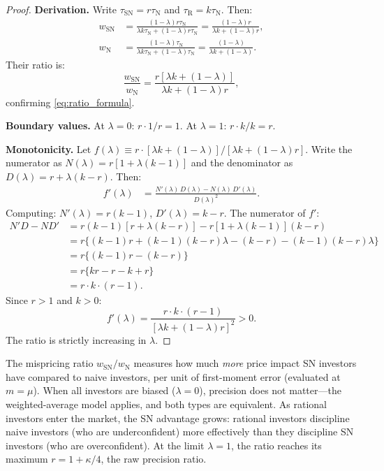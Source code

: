 \documentclass[12pt]{article}
\theoremstyle{plain}
\theoremstyle{definition}
\newcommand{\R}{\mathrm{R}}
\newcommand{\SN}{\mathrm{SN}}
\newcommand{\N}{\mathrm{N}}
\begin{document}
\begin{proof}
\textbf{Derivation.} Write $\tau_\SN = r\tau_\N$ and $\tau_\R = k\tau_\N$. Then:
\begin{align*}
w_\SN &= \frac{(1-\lambda)r\tau_\N}{\lambda k\tau_\N + (1-\lambda)r\tau_\N} = \frac{(1-\lambda)r}{\lambda k + (1-\lambda)r}, \\
w_\N &= \frac{(1-\lambda)\tau_\N}{\lambda k\tau_\N + (1-\lambda)\tau_\N} = \frac{(1-\lambda)}{\lambda k + (1-\lambda)}.
\end{align*}
Their ratio is:
\[
\frac{w_\SN}{w_\N} = \frac{r[\lambda k + (1-\lambda)]}{\lambda k + (1-\lambda)r},
\]
confirming \eqref{eq:ratio_formula}.

\textbf{Boundary values.} At $\lambda = 0$: $r \cdot 1/r = 1$. At $\lambda = 1$: $r \cdot k/k = r$.

\textbf{Monotonicity.} Let $f(\lambda) \equiv r \cdot [\lambda k + (1-\lambda)] / [\lambda k + (1-\lambda)r]$. Write the numerator as $N(\lambda) = r[1 + \lambda(k-1)]$ and the denominator as $D(\lambda) = r + \lambda(k - r)$. Then:
\begin{align*}
f'(\lambda) &= \frac{N'(\lambda)\,D(\lambda) - N(\lambda)\,D'(\lambda)}{D(\lambda)^2}.
\end{align*}
Computing: $N'(\lambda) = r(k-1)$, $D'(\lambda) = k - r$. The numerator of $f'$:
\begin{align*}
N'D - ND' &= r(k-1)[r + \lambda(k-r)] - r[1 + \lambda(k-1)](k-r) \\
&= r\bigl\{(k-1)r + (k-1)(k-r)\lambda - (k-r) - (k-1)(k-r)\lambda\bigr\} \\
&= r\bigl\{(k-1)r - (k-r)\bigr\} \\
&= r\bigl\{kr - r - k + r\bigr\} \\
&= r \cdot k \cdot (r - 1).
\end{align*}
Since $r > 1$ and $k > 0$:
\begin{equation}
\boxed{f'(\lambda) = \frac{r \cdot k \cdot (r - 1)}{[\lambda k + (1-\lambda)r]^2} > 0.}
\label{eq:ratio_derivative}
\end{equation}
The ratio is strictly increasing in $\lambda$.
\end{proof}

The mispricing ratio $w_\SN/w_\N$ measures how much \emph{more} price impact SN investors have compared to naive investors, per unit of first-moment error (evaluated at $m = \mu$). When all investors are biased ($\lambda = 0$), precision does not matter---the weighted-average model applies, and both types are equivalent. As rational investors enter the market, the SN advantage grows: rational investors discipline naive investors (who are underconfident) more effectively than they discipline SN investors (who are overconfident). At the limit $\lambda = 1$, the ratio reaches its maximum $r = 1 + \kappa/4$, the raw precision ratio.
\end{document}
